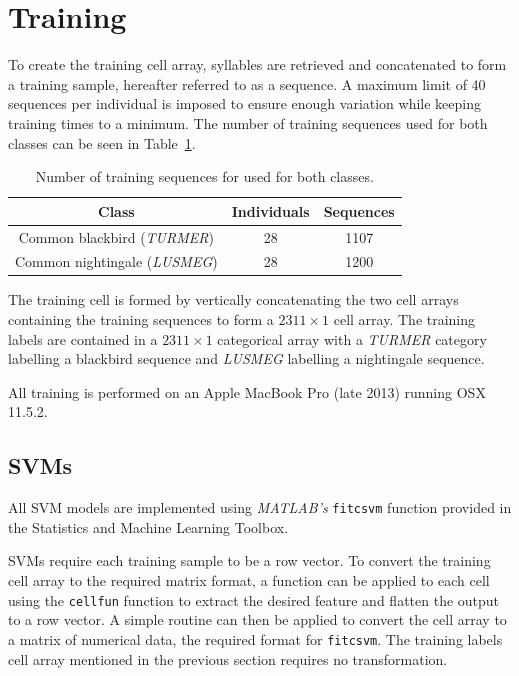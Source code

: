 \section{Training}\label{sec:training}

To create the training cell array, syllables are retrieved and concatenated to form
a training sample, hereafter referred to as a sequence. A maximum limit of 40
sequences per individual is imposed to ensure enough variation while keeping
training times to a minimum. The number of training sequences used for both
classes can be seen in Table~\ref{table:training_samples}.

\begin{table}[h!t]
\begin{center}
\begin{tabular}{c c c}
\toprule
Class & Individuals & Sequences \\ [0.5ex]
\midrule
Common blackbird (\textit{TURMER}) & 28 & 1107 \\
Common nightingale (\textit{LUSMEG}) & 28 & 1200 \\
\bottomrule
\end{tabular}
\caption{Number of training sequences for used for both
classes.}\label{table:training_samples}
\end{center}
\end{table}

The training cell is formed by vertically concatenating the two cell arrays
containing the training sequences to form a $2311 \times 1$ cell array. The
training labels are contained in a $2311 \times 1$ categorical array with a
\textit{TURMER} category labelling a blackbird sequence and \textit{LUSMEG}
labelling a nightingale sequence.

All training is performed on an Apple MacBook Pro (late 2013) running OSX
11.5.2.

\subsection{SVMs}

All SVM models are implemented using \textit{MATLAB's} \texttt{fitcsvm}
function provided in the Statistics and Machine Learning Toolbox.

SVMs require each training sample to be a row vector. To convert the training
cell array to the required matrix format, a function can be applied to each cell
using the \texttt{cellfun} function to extract the desired feature and flatten
the output to a row vector. A simple routine can then be applied to convert the
cell array to a matrix of numerical data, the required format for
\texttt{fitcsvm}. The training labels cell array mentioned in the previous
section requires no transformation.

